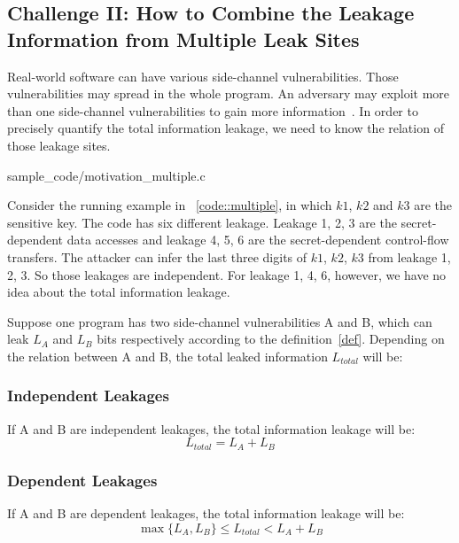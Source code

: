 \subsection{Challenge II: How to Combine the Leakage Information from Multiple Leak Sites}
Real-world software can have various side-channel vulnerabilities. Those vulnerabilities 
may spread in the whole program. An adversary may exploit more than one side-channel vulnerabilities 
to gain more information~\cite{7163052, 191010}. In order to precisely quantify the
total information leakage, we need to know the relation of those leakage sites. 



                 {sample_code/motivation_multiple.c}

                

Consider the running example in ~\ref{code::multiple}, in which $k1$, $k2$ and $k3$ are
the sensitive key. The code has six different leakage. Leakage 1, 2, 3 are the secret-dependent
data accesses and leakage 4, 5, 6 are the secret-dependent control-flow transfers.  
The attacker can infer the last three digits of
$k1$, $k2$, $k3$ from leakage 1, 2, 3. So those leakages are independent. For leakage 1, 4, 6, however,
we have no idea about the total information leakage.


Suppose one program has two side-channel vulnerabilities A and B, which can leak $L_A$ and $L_B$ bits respectively
according to the definition~\ref{def}. 
Depending on the relation between A and B, the total leaked information $L_{\mathit{total}}$ will be:

\subsubsection{Independent Leakages}
If A and B are independent leakages, the total information leakage will be:
$$L_{\mathit{total}} = L_A + L_B $$

\subsubsection{Dependent Leakages}
If A and B are dependent leakages, the total information leakage will be:
$$\max{\{L_A, L_B\}}  \leq L_{\mathit{total}} < L_A + L_B$$

